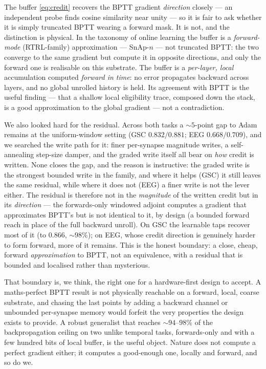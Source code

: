 \documentclass[11pt]{article}
\begin{document}
The buffer \eqref{eq:credit} recovers the BPTT gradient \emph{direction}
closely --- an independent probe finds cosine similarity near unity ---
so it is fair to ask whether it is simply truncated BPTT wearing a
forward mask. It is not, and the distinction is physical. In the
taxonomy of online learning \cite{marschall2020unified} the buffer is a
\emph{forward-mode} (RTRL-family) approximation --- SnAp-\(n\)
\cite{menick2021snap} --- not truncated BPTT: the two converge to the
same gradient but compute it in opposite directions, and only the
forward one is realisable on this substrate. The buffer is a
\emph{per-layer, local} accumulation computed \emph{forward in time}: no
error propagates backward across layers, and no global unrolled history
is held. Its agreement with BPTT is the useful finding --- that a
shallow local eligibility trace, composed down the stack, is a good
approximation to the global gradient --- not a contradiction.

We also looked hard for the residual. Across both tasks a
\({\sim}5\)-point gap to Adam remains at the uniform-window setting (GSC
\(0.832/0.881\); EEG \(0.668/0.709\)), and we searched the write path
for it: finer per-synapse magnitude writes, a self-annealing step-size
damper, and the graded write itself all bear on \emph{how} credit is
written. None closes the gap, and the reason is instructive: the graded
write is the strongest bounded write in the family, and where it helps
(GSC) it still leaves the same residual, while where it does not (EEG) a
finer write is not the lever either. The residual is therefore not in
the \emph{magnitude} of the written credit but in its \emph{direction}
--- the forwards-only windowed adjoint computes a gradient that
approximates BPTT's but is not identical to it, by design (a bounded
forward reach in place of the full backward unroll). On GSC the
learnable taps recover most of it (to \(0.866\), \({\sim}98\%\)); on
EEG, whose credit direction is genuinely harder to form forward, more of
it remains. This is the honest boundary: a close, cheap, forward
\emph{approximation} to BPTT, not an equivalence, with a residual that
is bounded and localised rather than mysterious.

That boundary is, we think, the right one for a hardware-first design to
accept. A maths-perfect BPTT result is not physically reachable on a
forward, local, coarse substrate, and chasing the last points by adding
a backward channel or unbounded per-synapse memory would forfeit the
very properties the design exists to provide. A robust generalist that
reaches \({\sim}94\)--\(98\%\) of the backpropagation ceiling on two
unlike temporal tasks, forwards-only and with a few hundred bits of
local buffer, is the useful object. Nature does not compute a perfect
gradient either; it computes a good-enough one, locally and forward, and
so do we.
\end{document}
